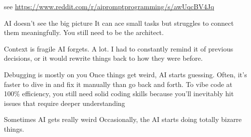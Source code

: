 \begin{frame}
    
    see \url{https://www.reddit.com/r/aipromptprogramming/s/awUqcBV4Jq}

    AI doesn't see the big picture It can ace small tasks but struggles to connect them meaningfully. You still need to be the architect.

    Context is fragile AI forgets. A lot. I had to constantly remind it of previous decisions, or it would rewrite things back to how they were before.

    Debugging is mostly on you Once things get weird, AI starts guessing. Often,
    it’s faster to dive in and fix it manually than go back and forth. To vibe
    code at 100\% efficiency, you still need solid coding skills because you’ll
    inevitably hit issues that require deeper understanding

    Sometimes AI gets really weird Occasionally, the AI starts doing totally bizarre things.

\end{frame}




